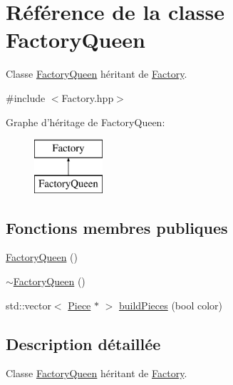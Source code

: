 \hypertarget{class_factory_queen}{\section{Référence de la classe Factory\-Queen}
\label{class_factory_queen}
}


Classe \hyperlink{class_factory_queen}{Factory\-Queen} héritant de \hyperlink{class_factory}{Factory}.  




{\ttfamily \#include $<$Factory.\-hpp$>$}

Graphe d'héritage de Factory\-Queen\-:\begin{figure}[H]
\begin{center}
\leavevmode
\includegraphics[height=2.000000cm]{class_factory_queen}
\end{center}
\end{figure}
\subsection*{Fonctions membres publiques}
\begin{DoxyCompactItemize}
\item 
\hyperlink{class_factory_queen_ab6cc7393c4cb1670ba041a44276a58cd}{Factory\-Queen} ()
\item 
\hyperlink{class_factory_queen_ab1e9dfe91a868c88b775d3220b8f9bc0}{$\sim$\-Factory\-Queen} ()
\item 
std\-::vector$<$ \hyperlink{class_piece}{Piece} $\ast$ $>$ \hyperlink{class_factory_queen_ac256e556b525b35d39f58af62fd1f962}{build\-Pieces} (bool color)
\end{DoxyCompactItemize}


\subsection{Description détaillée}
Classe \hyperlink{class_factory_queen}{Factory\-Queen} héritant de \hyperlink{class_factory}{Factory}. 

